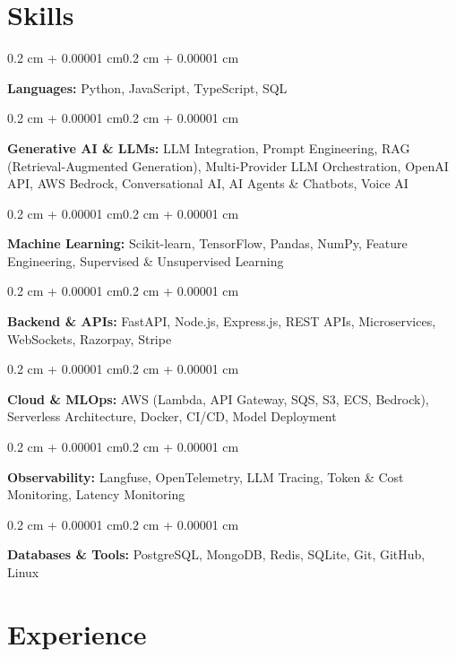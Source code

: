 \documentclass[10pt, letterpaper]{article}
\newenvironment{onecolentry}{
    \begin{adjustwidth}{0.2 cm + 0.00001 cm}{0.2 cm + 0.00001 cm}
}{
    \end{adjustwidth}
}
\begin{document}
    \section{Skills}
        \begin{onecolentry}
            \textbf{Languages:} Python, JavaScript, TypeScript, SQL
        \end{onecolentry}
        \vspace{0.06 cm}
        \begin{onecolentry}
            \textbf{Generative AI \& LLMs:} LLM Integration, Prompt Engineering, RAG (Retrieval-Augmented Generation), Multi-Provider LLM Orchestration, OpenAI API, AWS Bedrock, Conversational AI, AI Agents \& Chatbots, Voice AI
        \end{onecolentry}
        \vspace{0.06 cm}
        \begin{onecolentry}
            \textbf{Machine Learning:} Scikit-learn, TensorFlow, Pandas, NumPy, Feature Engineering, Supervised \& Unsupervised Learning
        \end{onecolentry}
        \vspace{0.06 cm}
        \begin{onecolentry}
            \textbf{Backend \& APIs:} FastAPI, Node.js, Express.js, REST APIs, Microservices, WebSockets, Razorpay, Stripe
        \end{onecolentry}
        \vspace{0.06 cm}
        \begin{onecolentry}
            \textbf{Cloud \& MLOps:} AWS (Lambda, API Gateway, SQS, S3, ECS, Bedrock), Serverless Architecture, Docker, CI/CD, Model Deployment
        \end{onecolentry}
        \vspace{0.06 cm}
        \begin{onecolentry}
            \textbf{Observability:} Langfuse, OpenTelemetry, LLM Tracing, Token \& Cost Monitoring, Latency Monitoring
        \end{onecolentry}
        \vspace{0.06 cm}
        \begin{onecolentry}
            \textbf{Databases \& Tools:} PostgreSQL, MongoDB, Redis, SQLite, Git, GitHub, Linux
        \end{onecolentry}

    \section{Experience}
\end{document}
